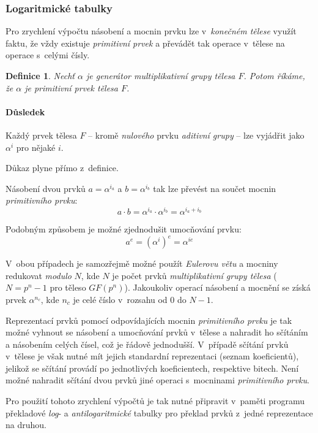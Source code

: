 \documentclass[thesis=M,czech,hidelinks]{FITthesis}[2012/06/26]
\newcommand{\0}{{\textcolor[gray]{0.100}{0}}}
\newtheorem{definice}{Definice}
\begin{document}
\subsubsection{Logaritmické tabulky}
Pro zrychlení výpočtu násobení a mocnin prvku lze v~\emph{konečném tělese} využít
faktu, že vždy existuje \emph{primitivní prvek} a převádět tak operace v~tělese
na operace s~celými čísly.

\begin{definice}
    Nechť $\alpha$ je \emph{generátor} \emph{multiplikativní grupy} tělesa $F$.
    Potom říkáme, že $\alpha$ je \emph{primitivní prvek} tělesa $F$.
\end{definice}

\paragraph{Důsledek} Každý prvek tělesa $F$ -- kromě \emph{nulového} prvku
\emph{aditivní grupy} -- lze vyjádřit jako $\alpha^i$ pro nějaké $i$.

Důkaz plyne přímo z~definice.

Násobení dvou prvků $a = \alpha^{i_a}$ a $b = \alpha^{i_b}$ tak lze převést na
součet mocnin \emph{primitivního prvku}:
$$ a \cdot b = \alpha^{i_a} \cdot \alpha^{i_b} = \alpha^{i_a + i_b} $$

Podobným způsobem je možné zjednodušit umocňování prvku:
$$ a^e = \left(\alpha^i\right)^e = \alpha^{i e} $$

V~obou případech je samozřejmě možné použít \emph{Eulerovu větu} a mocniny
redukovat \emph{modulo} $N$, kde $N$ je počet prvků \emph{multiplikativní grupy
tělesa} ($N=p^n-1$ pro těleso $GF(p^n)$). Jakoukoliv operací násobení a mocnění
se získá prvek $\alpha^{n_c}$, kde $n_c$ je celé číslo v~rozsahu od $0$ do $N-1$.

Reprezentací prvků pomocí odpovídajících mocnin \emph{primitivního prvku} je
tak možné vyhnout se násobení a umocňování prvků v~tělese a nahradit ho
sčítáním a násobením celých čísel, což je řádově jednodušší. V~případě sčítání
prvků v~tělese je však nutné mít jejich standardní reprezentaci (seznam
koeficientů), jelikož se sčítání provádí po jednotlivých koeficientech,
respektive bitech. Není možné nahradit sčítání dvou prvků jiné operaci
s~mocninami \emph{primitivního prvku}.

Pro použití tohoto zrychlení výpočtů je tak nutné připravit v~paměti programu
překladové \emph{log}- a \emph{antilogaritmické} tabulky pro překlad prvků
z~jedné reprezentace na druhou.
\end{document}
